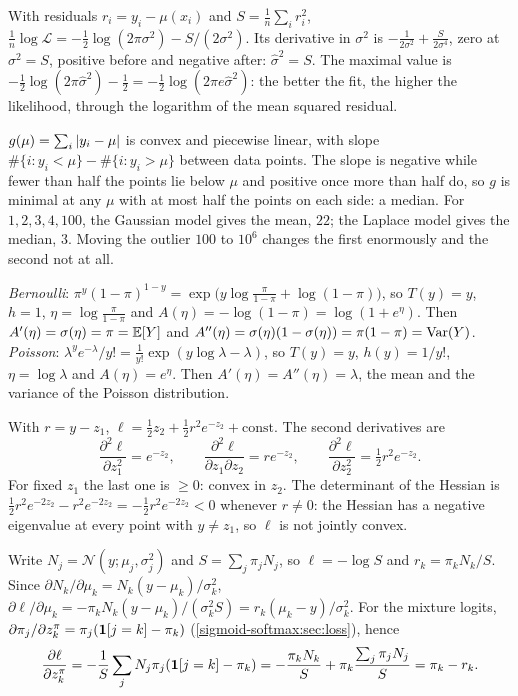 With residuals $r_i = y_i - \mu(x_i)$ and $S = \frac1n\sum_ir_i^2$,
$\frac1n\log\mathcal L = -\frac12\log(2\pi\sigma^2) - S/(2\sigma^2)$. Its derivative in $\sigma^2$ is
$-\frac1{2\sigma^2} + \frac S{2\sigma^4}$, zero at $\sigma^2 = S$, positive before and negative after: $\hat\sigma^2 = S$.
The maximal value is $-\frac12\log(2\pi\hat\sigma^2) - \frac12 = -\frac12\log(2\pi e\hat\sigma^2)$: the better the fit, the higher the
likelihood, through the logarithm of the mean squared residual.

$g(\mu) = \sum_i\left|y_i - \mu\right|$ is convex and piecewise linear, with slope
$\#\{i : y_i<\mu\} - \#\{i : y_i>\mu\}$ between data points. The slope is negative while fewer than
half the points lie below $\mu$ and positive once more than half do, so $g$ is minimal at
any $\mu$ with at most half the points on each side: a median. For $1, 2, 3, 4, 100$, the
Gaussian model gives the mean, $22$; the Laplace model gives the median, $3$. Moving
the outlier $100$ to $10^6$ changes the first enormously and the second not at all.

\emph{Bernoulli}: $\pi^y(1 - \pi)^{1-y} = \exp\bigl(y\log\frac\pi{1 - \pi} + \log(1 - \pi)\bigr)$, so $T(y) = y$, $h = 1$,
$\eta = \log\frac\pi{1 - \pi}$ and $A(\eta) = -\log(1 - \pi) = \log(1 + e^\eta)$. Then $A'(\eta) = \sigma(\eta) = \pi = \mathbb{E}[Y]$ and
$A''(\eta) = \sigma(\eta)(1 - \sigma(\eta)) = \pi(1 - \pi) = \operatorname{Var}(Y)$.
\emph{Poisson}: $\lambda^ye^{-\lambda}/y! = \frac1{y!}\exp(y\log\lambda - \lambda)$, so $T(y) = y$, $h(y) = 1/y!$, $\eta = \log\lambda$ and
$A(\eta) = e^\eta$. Then $A'(\eta) = A''(\eta) = \lambda$, the mean and the variance of the Poisson distribution.

With $r = y - z_1$, $\ell = \frac12z_2 + \frac12r^2e^{-z_2} + \text{const}$. The second derivatives are
\[
  \frac{\partial^2\ell}{\partial z_1^2} = e^{-z_2},\qquad
  \frac{\partial^2\ell}{\partial z_1\partial z_2} = re^{-z_2},\qquad
  \frac{\partial^2\ell}{\partial z_2^2} = \tfrac12r^2e^{-z_2}.
\]
For fixed $z_1$ the last one is $\geq0$: convex in $z_2$. The determinant of the Hessian is
$\frac12r^2e^{-2z_2} - r^2e^{-2z_2} = -\frac12r^2e^{-2z_2}<0$ whenever $r\neq0$: the Hessian has a negative eigenvalue at
every point with $y\neq z_1$, so $\ell$ is not jointly convex.

Write $N_j = \mathcal N(y;\mu_j,\sigma_j^2)$ and $S = \sum_j\pi_jN_j$, so $\ell = -\log S$ and $r_k = \pi_kN_k/S$. Since
$\partial N_k/\partial\mu_k = N_k(y - \mu_k)/\sigma_k^2$,
$\partial\ell/\partial\mu_k = -\pi_kN_k(y - \mu_k)/(\sigma_k^2S) = r_k(\mu_k - y)/\sigma_k^2$. For the mixture logits,
$\partial\pi_j/\partial z^\pi_k = \pi_j(\mathbf{1}[j = k] - \pi_k)$ (\cref{sigmoid-softmax:sec:loss}), hence
\[
  \frac{\partial\ell}{\partial z^\pi_k} = -\frac1S\sum_jN_j\pi_j(\mathbf{1}[j = k] - \pi_k) = -\frac{\pi_kN_k}S + \pi_k\frac{\sum_j\pi_jN_j}S = \pi_k - r_k .
\]

